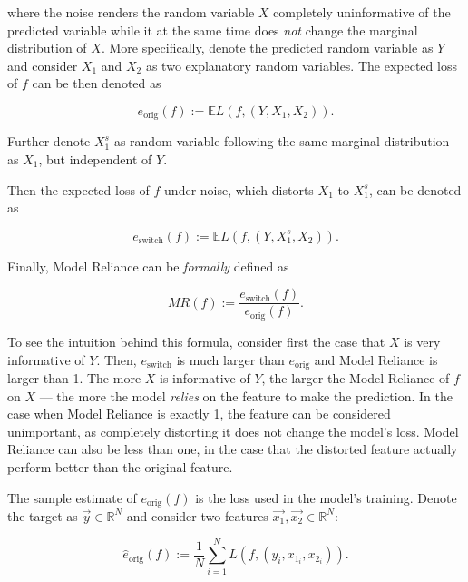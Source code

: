 			where the noise renders the random variable $X$ completely uninformative of the predicted variable while it at the same time does \textit{not} change the marginal distribution of $X$. More specifically, denote the predicted random variable as $Y$ and consider $X_1$ and $X_2$ as two explanatory random variables. The expected loss of $f$ can be then denoted as 
			
			\begin{equation*}
				e_{\text{orig}}(f):= \mathbb{E} L(f,(Y,X_1, X_2)).
			\end{equation*} 
			
			Further denote $X_1^s$ as random variable following the same marginal distribution as $X_1$, but independent of $Y$. 
			
			Then the expected loss of $f$ under noise, which distorts $X_1$ to $X_1^s$, can be denoted as 
			
			\begin{equation*}
				e_{\text{switch}}(f):= \mathbb{E} L(f,(Y,X_1^s, X_2)).
			\end{equation*} 
			
			Finally, Model Reliance can be \textit{formally} defined as 
			
			\begin{equation*}
				MR(f):=\frac{e_{\text{switch}}(f)}{e_{\text{orig}}(f)}.
			\end{equation*}
			
			To see the intuition behind this formula, consider first the case that $X$ is very informative of $Y$. Then, 	$e_{\text{switch}}$ is much larger than $e_{\text{orig}}$ and Model Reliance is larger than 1. The more $X$ is informative of $Y$, the larger the  Model Reliance of $f$ on $X$ --- the more the model \textit{relies} on the feature to make the prediction. In the case when Model Reliance is exactly 1, the feature can be considered unimportant, as completely distorting it does not change the model's loss. Model Reliance can also be less than one, in the case that the distorted feature actually perform better than the original feature.
					
			The sample estimate of $e_{\text{orig}}(f)$ is the loss used in the model's training. Denote the target as $\vec{y} \in \mathbb{R}^N$ and consider two features $\vec{x_1}, \vec{x_2} \in \mathbb{R}^{N}$:
			
			\begin{equation*}
				\hat{e}_{\text{orig}}(f):= \frac{1}{N} \sum_{i=1}^{N} L\left(f, (y_i, x_{1_i}, x_{2_i}) \right).
			\end{equation*} 
			
